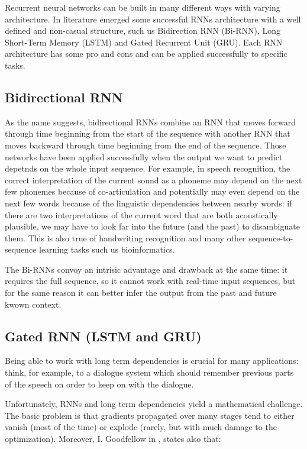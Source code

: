Recurrent neural networks can be built in many diﬀerent ways with
varying architecture. In literature emerged some successful RNNs
architecture with a well defined and non-casual structure, such us
Bidirection RNN (Bi-RNN), Long Short-Term Memory (LSTM) and Gated
Recurrent Unit (GRU). Each RNN architecture has some pro and cons and
can be applied successfully to specific tasks.

\subsection{Bidirectional RNN}

As the name suggests, bidirectional RNNs combine an RNN that moves
forward through time beginning from the start of the sequence with
another RNN that moves backward through time beginning from the end of
the sequence. Those networks have been applied successfully when the
output we want to predict depetnds on the whole input sequence. For
example, in speech recognition, the correct interpretation of the
current sound as a phoneme may depend on the next few phonemes because
of co-articulation and potentially may even depend on the next few
words because of the linguistic dependencies between nearby words: if
there are two interpretations of the current word that are both
acoustically plausible, we may have to look far into the future (and
the past) to disambiguate them. This is also true of handwriting
recognition and many other sequence-to-sequence learning tasks such us
bioinformatics.

The Bi-RNNs convoy an intrisic advantage and drawback at the same
time: it requires the full sequence, so it cannot work with real-time
input sequences, but for the same reason it can better infer the
output from the past and future kwown context.

\subsection{Gated RNN (LSTM and GRU)}
\label{subsec:gated-rnn}

Being able to work with long term dependencies is crucial for many
applications: think, for example, to a dialogue system which should
remember previous parts of the speech on order to keep on with the
dialogue.

Unfortunately, RNNs and long term dependencies yield a mathematical
challenge. The basic problem is that gradients propagated over many
stages tend to either vanish (most of the time) or explode (rarely,
but with much damage to the optimization). Moreover, I. Goodfellow
\etal{} in \cite{goodfellow2016deep}, states also that:

